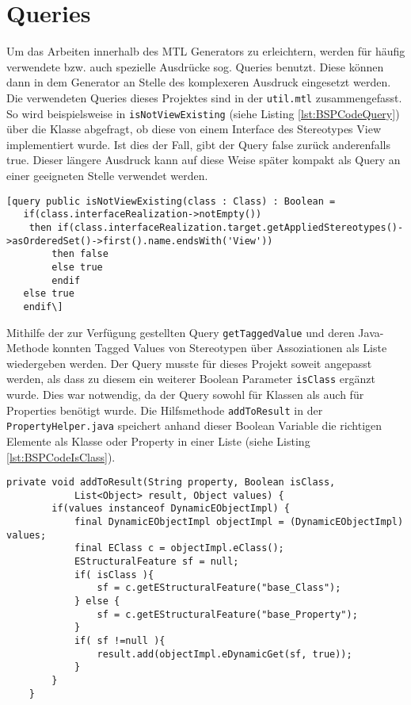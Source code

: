 \section{Queries} \label{Queries}
Um das Arbeiten innerhalb des MTL Generators zu erleichtern, werden für häufig verwendete bzw. auch spezielle Ausdrücke sog. Queries benutzt. Diese können dann in dem Generator an Stelle des komplexeren Ausdruck eingesetzt werden. Die verwendeten Queries dieses Projektes sind in der \texttt{util.mtl} zusammengefasst. So wird beispielsweise in \texttt{isNotViewExisting} (siehe Listing \ref{lst:BSPCodeQuery}) über die Klasse abgefragt, ob diese von einem Interface des Stereotypes View implementiert wurde. Ist dies der Fall, gibt der Query false zurück anderenfalls true. Dieser längere Ausdruck kann auf diese Weise später kompakt als Query an einer geeigneten Stelle verwendet werden.\\

\lstset{language=OCL}
\begin{lstlisting}[caption={Query für isNotViewExisting}, label={lst:BSPCodeQuery}]
[query public isNotViewExisting(class : Class) : Boolean = 
   if(class.interfaceRealization->notEmpty())
	then if(class.interfaceRealization.target.getAppliedStereotypes()->asOrderedSet()->first().name.endsWith('View')) 
		then false 
		else true 
        endif 
   else true 
   endif\]
\end{lstlisting}

Mithilfe der zur Verfügung gestellten Query \texttt{getTaggedValue} und deren Java-Methode konnten Tagged Values von Stereotypen über Assoziationen als Liste wiedergeben werden. Der Query musste für dieses Projekt soweit angepasst werden, als dass zu diesem ein weiterer Boolean Parameter \texttt{isClass} ergänzt wurde. Dies war notwendig, da der Query sowohl für Klassen als auch für Properties benötigt wurde.
Die Hilfsmethode \texttt{addToResult} in der \texttt{PropertyHelper.java} speichert anhand dieser Boolean Variable die richtigen Elemente als Klasse oder Property in einer Liste (siehe Listing \ref{lst:BSPCodeIsClass}).
\lstset{language=Java}
\begin{lstlisting}[caption={Hilfsmethode addToResult der PropertyHelper.java}, label={lst:BSPCodeIsClass}]
private void addToResult(String property, Boolean isClass,
			List<Object> result, Object values) {
		if(values instanceof DynamicEObjectImpl) {
			final DynamicEObjectImpl objectImpl = (DynamicEObjectImpl) values;
			final EClass c = objectImpl.eClass();
			EStructuralFeature sf = null;
			if( isClass ){
				sf = c.getEStructuralFeature("base_Class");
			} else {
				sf = c.getEStructuralFeature("base_Property");
			}
			if( sf !=null ){
				result.add(objectImpl.eDynamicGet(sf, true));
			}
		}
	}
\end{lstlisting}